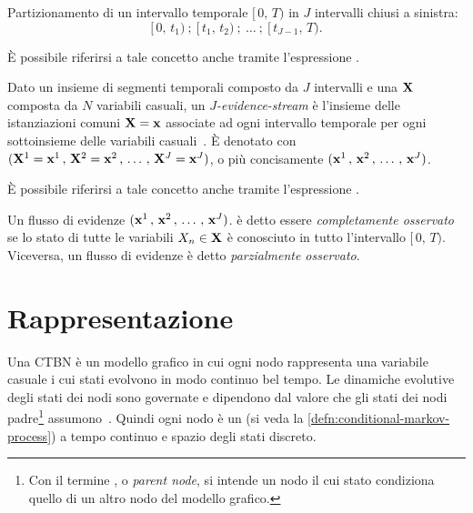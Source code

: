 \begin{definizione}\label{defn:j-time-segment}
Partizionamento di un intervallo temporale $[\,0,\,T)$ in $J$ intervalli chiusi a sinistra:
\[
[\,0,\,t_1)\:;\:[\,t_1,\,t_2)\:;\:\dotsc\:;\:[\,t_{J-1},\,T)\text{.}
\]
\end{definizione}
\begin{notabene}
\`E possibile riferirsi a tale concetto anche tramite l'espressione \emph{}.
\end{notabene}
\begin{definizione}\label{defn:j-evidence-stream}
Dato un insieme di segmenti temporali composto da $J$ intervalli e una \pv{} $\mathbf{X}$ composta da $N$ variabili casuali, un \emph{$J$-evidence-stream} è l'insieme delle istanziazioni comuni $\mathbf{X}=\mathbf{x}$ associate ad ogni intervallo temporale per ogni sottoinsieme delle variabili casuali~\citep{Stella2012}. \`E denotato con $(\mathbf{X}^1=\mathbf{x}^1\,,\,\mathbf{X}^2=\mathbf{x}^2\,,\,\dotsc\,,\,\mathbf{X}^J=\mathbf{x}^J)$, o più concisamente $(\mathbf{x}^1\,,\,\mathbf{x}^2\,,\,\dotsc\,,\,\mathbf{x}^{J})$.
\end{definizione}
\begin{notabene}
\`E possibile riferirsi a tale concetto anche tramite l'espressione \emph{}.
\end{notabene}
\begin{notabene}
Un flusso di evidenze $(\mathbf{x}^1\,,\,\mathbf{x}^2\,,\,\dotsc\,,\,\mathbf{x}^{J})$. è detto essere \emph{completamente osservato} se lo stato di tutte le variabili $\mathnormal{X_n}\in\mathbf{X}$ è conosciuto in tutto l'intervallo $[\,0,\,T)$. Viceversa, un flusso di evidenze è detto \emph{parzialmente osservato}.
\end{notabene}

\section{Rappresentazione}
\label{sec:ctbn-rappresentazione}
Una \acl{CTBN} è un modello grafico in cui ogni nodo rappresenta una variabile casuale i cui stati evolvono in modo continuo bel tempo. Le dinamiche evolutive degli stati dei nodi sono governate e dipendono dal valore che gli stati dei nodi padre\footnote{Con il termine , o \emph{parent node}, si intende un nodo il cui stato condiziona quello di un altro nodo del modello grafico.} assumono~\citep{Stella2012}. Quindi ogni nodo è un \mprocess*{} \cond*{} (si veda la \autoref{defn:conditional-markov-process}) a tempo continuo e spazio degli stati discreto.

